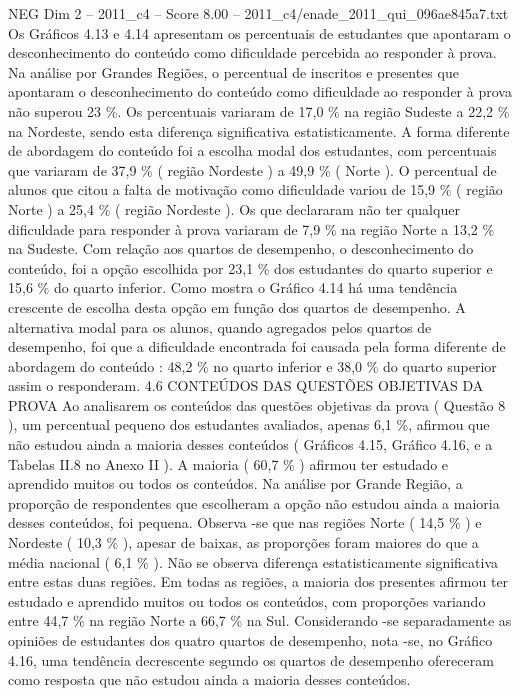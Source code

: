 \begin{textsample}{NEG Dim 2 – 2011\_c4 – Score 8.00 – 2011\_c4/enade\_2011\_qui\_096ae845a7.txt}
Os Gráficos 4.13 e 4.14 apresentam os percentuais de estudantes que apontaram o desconhecimento do conteúdo como dificuldade percebida ao responder à prova.
Na análise por Grandes Regiões, o percentual de inscritos e presentes que apontaram o desconhecimento do conteúdo como dificuldade ao responder à prova não superou 23 \%.
Os percentuais variaram de 17,0 \% na região Sudeste a 22,2 \% na Nordeste, sendo esta diferença significativa estatisticamente.
A forma diferente de abordagem do conteúdo foi a escolha modal dos estudantes, com percentuais que variaram de 37,9 \% ( região Nordeste ) a 49,9 \% ( Norte ).
O percentual de alunos que citou a falta de motivação como dificuldade variou de 15,9 \% ( região Norte ) a 25,4 \% ( região Nordeste ).
Os que declararam não ter qualquer dificuldade para responder à prova variaram de 7,9 \% na região Norte a 13,2 \% na Sudeste.
Com relação aos quartos de desempenho, o desconhecimento do conteúdo, foi a opção escolhida por 23,1 \% dos estudantes do quarto superior e 15,6 \% do quarto inferior.
Como mostra o Gráfico 4.14 há uma tendência crescente de escolha desta opção em função dos quartos de desempenho.
A alternativa modal para os alunos, quando agregados pelos quartos de desempenho, foi que a dificuldade encontrada foi causada pela forma diferente de abordagem do conteúdo : 48,2 \% no quarto inferior e 38,0 \% do quarto superior assim o responderam. 4.6 CONTEÚDOS DAS QUESTÕES OBJETIVAS DA PROVA Ao analisarem os conteúdos das questões objetivas da prova ( Questão 8 ), um percentual pequeno dos estudantes avaliados, apenas 6,1 \%, afirmou que não estudou ainda a maioria desses conteúdos ( Gráficos 4.15, Gráfico 4.16, e a Tabelas II.8 no Anexo II ).
A maioria ( 60,7 \% ) afirmou ter estudado e aprendido muitos ou todos os conteúdos.
Na análise por Grande Região, a proporção de respondentes que escolheram a opção não estudou ainda a maioria desses conteúdos, foi pequena.
Observa -se que nas regiões Norte ( 14,5 \% ) e Nordeste ( 10,3 \% ), apesar de baixas, as proporções foram maiores do que a média nacional ( 6,1 \% ).
Não se observa diferença estatisticamente significativa entre estas duas regiões.
Em todas as regiões, a maioria dos presentes afirmou ter estudado e aprendido muitos ou todos os conteúdos, com proporções variando entre 44,7 \% na região Norte a 66,7 \% na Sul.
Considerando -se separadamente as opiniões de estudantes dos quatro quartos de desempenho, nota -se, no Gráfico 4.16, uma tendência decrescente segundo os quartos de desempenho ofereceram como resposta que não estudou ainda a maioria desses conteúdos.

\end{textsample}
